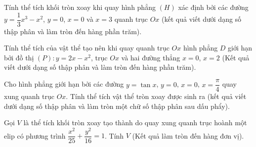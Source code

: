 \begin{ex}%
	Tính thể tích khối tròn xoay khi quay hình phẳng $(H)$ xác định bởi các đường $y=\dfrac{1}{3}x^3-x^2$, $y=0$, $x=0$ và $x=3$ quanh trục $Ox$ (kết quả viết dưới dạng số thập phân và làm tròn đến hàng phần trăm).
\end{ex}

\begin{ex}%
	Tính thể tích của vật thể tạo nên khi quay quanh trục $Ox$ hình phẳng $D$ giới hạn bởi đồ thị $(P)\colon y=2x-x^2$, trục $Ox$ và hai đường thẳng $x=0$, $x=2$ (Kết quả viết dưới dạng số thập phân và làm tròn đến hàng phần trăm).
\end{ex}

\begin{ex}%
	Cho hình phẳng giới hạn bởi các đường $y=\tan x$, $y=0$, $x=0$, $x=\dfrac{\pi}{4}$ quay xung quanh trục $Ox$. Tính thể tích vật thể tròn xoay được sinh ra (kết quả viết dưới dạng số thập phân và làm tròn một chữ số thập phân sau dấu phẩy).
\end{ex}

\begin{ex}%
	Gọi $V$ là thể tích khối tròn xoay tạo thành do quay xung quanh trục hoành một elip có phương trình $\dfrac{x^2}{25}+\dfrac{y^2}{16}=1$. Tính $V$ (Kết quả làm tròn đến hàng đơn vị).
\end{ex}


